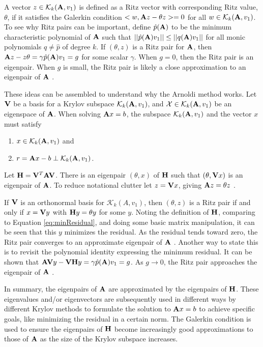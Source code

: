 A vector $z \in \mathcal{K}_{k}(\mathbf{A},v_{1})$ is defined as a Ritz vector with corresponding Ritz value, $\theta$, if it satisfies the Galerkin condition $<w, \mathbf{A}z - \theta z> = 0 $ for all $w \in \mathcal{K}_{k}(\mathbf{A}, v_{1})$. To see why Ritz pairs can be important, define $\hat{p}(\mathbf{A})$ to be the minimum characteristic polynomial of $\mathbf{A}$ such that $||\hat{p}(\mathbf{A})v_{1}|| \le ||q(\mathbf{A})v_{1}||$ for all monic polynomials $q \ne \hat{p}$ of degree $k$. If $(\theta, z)$ is a Ritz pair for $\mathbf{A}$, then $\mathbf{A}z - z\theta = \gamma \hat{p}(\mathbf{A})v_{1} = g$ for some scalar $\gamma$. When $g = 0$, then the Ritz pair is an eigenpair. When $g$ is small, the Ritz pair is likely a close approximation to an eigenpair of $\mathbf{A}$ \cite{Sorensen1996}. 

These ideas can be assembled to understand why the Arnoldi method works. Let $\mathbf{V}$ be a basis for a Krylov subspace $\mathcal{K}_{k}(\mathbf{A},v_{1})$, and $\mathcal{X} \in \mathcal{K}_{k}(\mathbf{A},v_{1})$ be an eigenspace of $\mathbf{A}$. When solving $\mathbf{A}x = b$, the subspace $\mathcal{K}_{k}(\mathbf{A},v_{1})$ and the vector $x$ must satisfy
\begin{enumerate}
  \item $x \in \mathcal{K}_{k}(\mathbf{A},v_{1})$ and
  \item $r = \mathbf{A}x - b \perp \mathcal{K}_{k}(\mathbf{A},v_{1})$. 
\end{enumerate} 
%
Let $\mathbf{H} = \mathbf{V}^{T}\mathbf{AV}$. There is an eigenpair $(\theta, x)$ of $\mathbf{H}$ such that $(\theta, \mathbf{V}x)$ is an eigenpair of $\mathbf{A}$. To reduce notational clutter let $z = \mathbf{V}x$, giving $\mathbf{A}z = \theta z$ \cite{Stewart2001}. 

If $\mathbf{V}$ is an orthonormal basis for  $\mathcal{K}_{k}(A,v_{1})$, then $(\theta, z)$ is a Ritz pair if and only if $x = \mathbf{V}y$ with $\mathbf{H}y = \theta y$ for some $y$. Noting the definition of $\mathbf{H}$, comparing to Equation \eqref{eq:minResidual}, and doing some basic matrix manipulation, it can be seen that this $y$ minimizes the residual. As the residual tends toward zero, the Ritz pair converges to an approximate eigenpair of $\mathbf{A}$ \cite{Stewart2001}. Another way to state this is to revisit the polynomial identity expressing the minimum residual. It can be shown that $\mathbf{AV}y - \mathbf{VH}y = \gamma \hat{p}(\mathbf{A})v_{1} = g$. As $g \to 0$, the Ritz pair approaches the eigenpair of $\mathbf{A}$ \cite{Sorensen1996}. 

In summary, the eigenpairs of $\mathbf{A}$ are approximated by the eigenpairs of $\mathbf{H}$. These eigenvalues and/or eigenvectors are subsequently used in different ways by different Krylov methods to formulate the solution to $\mathbf{A}x = b$ to achieve specific goals, like minimizing the residual in a certain norm. The Galerkin condition is used to ensure the eigenpairs of $\mathbf{H}$ become increasingly good approximations to those of $\mathbf{A}$ as the size of the Krylov subspace increases. 

